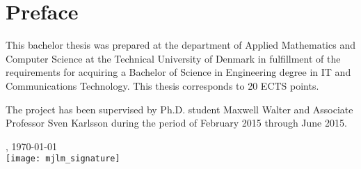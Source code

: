 \chapter{Preface}
This bachelor thesis was prepared at the department of Applied
Mathematics and Computer Science at the Technical University of
Denmark in fulfillment of the requirements for acquiring a Bachelor of
Science in Engineering degree in IT and Communications
Technology. This thesis corresponds to 20 ECTS points.

The project has been supervised by Ph.D. student Maxwell Walter and
Associate Professor Sven Karlsson during the period of February 2015
through June 2015.

\vfill

{
\centering
    \thesislocation{}, \today\\[1cm]
    \hspace{3cm}\texttt{[image: mjlm\_signature]}\\[1cm]
\begin{flushright}
    \thesisauthor{}
\end{flushright}
}